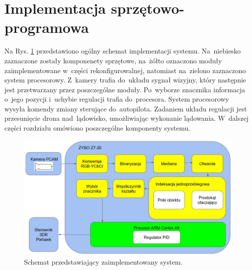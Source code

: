 \section{Implementacja sprzętowo-programowa}
\label{sec:implementacja_sprzetowo_programowa}
Na Rys. \ref{fig:system} przedstawiono ogólny schemat implementacji systemu. Na~niebiesko zaznaczone zostały komponenety sprzętowe, na~żółto oznaczono moduły zaimplementowane w~części rekonfigurowalnej, natomiast na~zielono zaznaczono system procesorowy. Z~kamery trafia do~układu sygnał wizyjny, który następnie jest przetwarzany przez poszczególne moduły. Po~wyborze znacznika informacja o~jego pozycji i~uchybie regulacji trafia do~procesora. System procesorowy wysyła komendy zmiany sterujące do~autopilota. Zadaniem układu regulacji jest przesunięcie drona nad~lądowisko, umożliwiając wykonanie lądowania.
W~dalszej części rozdziału omówiono poszczególne komponenty systemu.   
\begin{figure}[h]
	\centering
	\includegraphics[width=\textwidth]{system.jpg}
	\caption{Schemat przedstawiający zaimplementowany system.}
	\label{fig:system}
\end{figure}  
